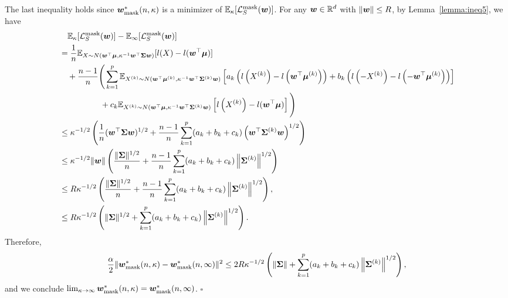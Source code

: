 The last inequality holds since $\wmask$ is a minimizer of $\mathbb{E}_\kappa [\lossmask (\vw)]$.
For any $\vw \in \mathbb{R}^d$ with $\lVert \vw \rVert \leq R$, by Lemma~\ref{lemma:ineq5}, we have
\begin{align*}
&\quad\mathbb{E}_\kappa [\lossmask (\vw)] - \mathbb{E}_\infty [\lossmask(\vw)]\\
&= \frac{1}{n} \mathbb{E}_{X \sim N(\vw^\top \vmu, \kappa^{-1} \vw^\top \mSigma \vw)}[l(X) - l(\vw^\top \vmu)] \\
&\quad + \frac{n-1}{n} \Bigg( \sum_{k=1}^p \mathbb{E}_{X^{(k)} \sim N(\vw^\top \vmu^{(k)}, \kappa^{-1} \vw^\top \mSigma^{(k)} \vw)}\left[a_k \left(l\left(X^{(k)}\right)-l\left(\vw^\top \vmu^{(k)}\right) \right) +b_k \left(l\left(-X^{(k)}\right) - l\left(- \vw^\top \vmu^{(k)}\right)\right) \right]\\
& \qquad \qquad \quad+ c_k \mathbb{E}_{X^{(k)}\sim N(\vw^\top \vmu, \kappa^{-1} \vw^\top \mSigma^{(k)}\vw )}\left[l\left(X^{(k)}\right) - l(\vw^\top \vmu)\right] \Bigg)\\
&\leq \kappa^{-1/2} \left( \frac{1}{n} (\vw^\top \mSigma \vw)^{1/2} + \frac{n-1}{n} \sum_{k=1}^p (a_k+ b_k +c_k) \left(\vw^\top \mSigma^{(k)} \vw\right)^{1/2} \right) \\
&\leq  \kappa^{-1/2} \lVert \vw \rVert \left( \frac{\lVert \mSigma \rVert^{1/2}}{n} + \frac{n-1}{n}  \sum_{k=1}^p (a_k + b_k + c_k) \left \lVert \mSigma ^{(k)}\right \rVert^{1/2}\right)\\
&\leq R \kappa^{-1/2} \left( \frac{\lVert \mSigma \rVert^{1/2}}{n} +  \frac{n-1}{n}  \sum_{k=1}^p (a_k + b_k + c_k) \left \lVert \mSigma ^{(k)}\right \rVert^{1/2}\right),\\
&\leq R \kappa^{-1/2} \left( \lVert \mSigma \rVert^{1/2} + \sum_{k=1}^p (a_k + b_k + c_k) \left \lVert \mSigma ^{(k)}\right \rVert^{1/2}\right).
\end{align*}
Therefore, 
\begin{equation}\label{eqn:mask_uniform_converge}
    \frac{\alpha}{2 }\lVert \wmask - \wmask[\infty]\rVert^2 \leq 2 R \kappa^{-1/2} \left( \lVert \mSigma \rVert + \sum_{k=1}^p (a_k + b_k + c_k) \left \lVert \mSigma ^{(k)}\right \rVert^{1/2}\right),
\end{equation}
and we conclude $\lim_{\kappa \rightarrow \infty} \wmask = \wmask[\infty]$. \hfill $\square$